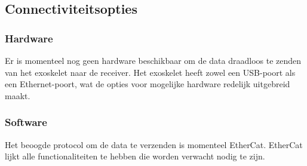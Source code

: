 \subsection{Connectiviteitsopties}
\subsubsection{Hardware}
Er is momenteel nog geen hardware beschikbaar om de data draadloos te zenden van het exoskelet naar de receiver. Het exoskelet heeft zowel een USB-poort als een Ethernet-poort, wat de opties voor mogelijke hardware redelijk uitgebreid maakt.
\subsubsection{Software}
Het beoogde protocol om de data te verzenden is momenteel EtherCat. EtherCat lijkt alle functionaliteiten te hebben die worden verwacht nodig te zijn. 